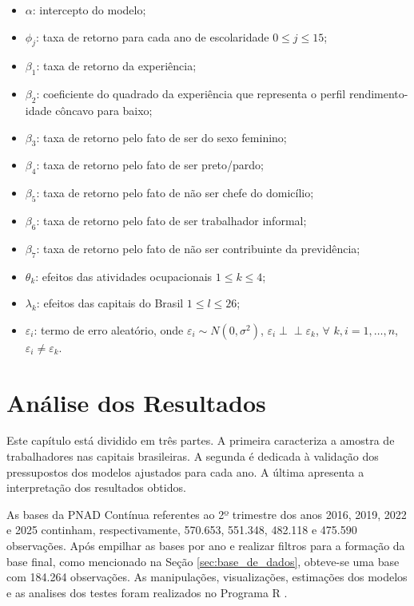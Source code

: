\documentclass[12pt,a4paper,header]{abnt}
\newcommand{\indep}{\mathrel{\perp\!\!\!\perp}}
\begin{document}
\begin{itemize}
    \item $\alpha$: intercepto do modelo;
    \item $\phi_j$: taxa de retorno para cada ano de escolaridade $0 \leq j \leq 15$;
    \item $\beta_1$: taxa de retorno da experiência;
    \item $\beta_2$: coeficiente do quadrado da experiência que representa o perfil rendimento-idade côncavo para baixo;
    \item $\beta_3$: taxa de retorno pelo fato de ser do sexo feminino;
    \item $\beta_4$: taxa de retorno pelo fato de ser preto/pardo;
    \item $\beta_5$: taxa de retorno pelo fato de não ser chefe do domicílio;
    \item $\beta_6$: taxa de retorno pelo fato de ser trabalhador informal;
    \item $\beta_7$: taxa de retorno pelo fato de não ser contribuinte da previdência;
    \item $\theta_k$: efeitos das atividades ocupacionais $1 \leq k \leq 4$;
    \item $\lambda_k$: efeitos das capitais do Brasil $1 \leq l \leq 26$;
    \item $\varepsilon_i$: termo de erro aleatório, onde $\varepsilon_i \sim N(0, \sigma^2)$, $\varepsilon_i \indep \varepsilon_k$, $\forall$ $k,i=1,\ldots, n$, $\varepsilon_i \neq \varepsilon_k$.
\end{itemize}





\chapter{Análise dos Resultados} \label{cap:analise_resultados}

Este capítulo está dividido em três partes. A primeira caracteriza a amostra de trabalhadores nas capitais brasileiras. A segunda é dedicada à validação dos pressupostos dos modelos ajustados para cada ano. A última apresenta a interpretação dos resultados obtidos.

As bases da PNAD Contínua referentes ao 2º trimestre dos anos 2016, 2019, 2022 e 2025 continham, respectivamente, 570.653, 551.348, 482.118 e 475.590 observações. Após empilhar as bases por ano e realizar filtros para a formação da base final, como mencionado na Seção \ref{sec:base_de_dados}, obteve-se uma base com 184.264 observações. As manipulações, visualizações, estimações dos modelos e as analises dos testes foram realizados no Programa R \cite{R}.
\end{document}
